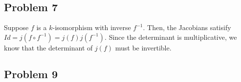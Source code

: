 \documentclass{article}
\theoremstyle{definition}
\theoremstyle{definition}
\theoremstyle{definition}
\theoremstyle{definition}
\theoremstyle{definition}
\theoremstyle{definition}
\theoremstyle{definition}
\begin{document}
\subsection*{Problem 7}
Suppose $f$ is a $k$-isomorphism with inverse $f^{-1}$. Then, the Jacobians satisify $Id=j(f\circ f^{-1})=j(f)j(f^{-1})$. Since the determinant is multiplicative, we know that the determinant of $j(f)$ must be invertible. 




\subsection*{Problem 9}
\end{document}
